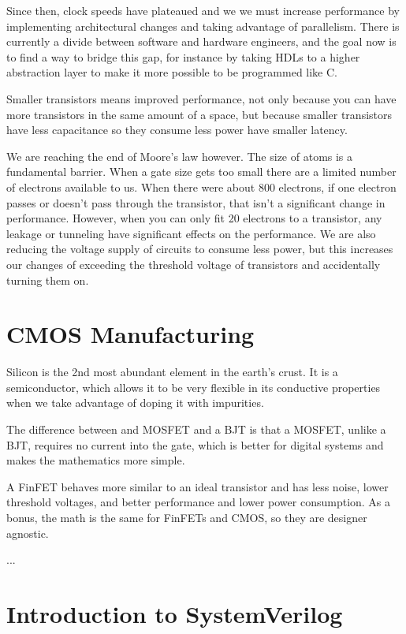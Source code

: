 \documentclass{article}
\begin{document}
Since then, clock speeds have plateaued and we we must increase performance by implementing architectural changes and taking advantage of parallelism. There is currently a divide between software and hardware engineers, and the goal now is to find a way to bridge this gap, for instance by taking HDLs to a higher abstraction layer to make it more possible to be programmed like C.

Smaller transistors means improved performance, not only because you can have more transistors in the same amount of a space, but because smaller transistors have less capacitance so they consume less power have smaller latency.

We are reaching the end of Moore's law however. The size of atoms is a fundamental barrier. When a gate size gets too small there are a limited number of electrons available to us. When there were about 800 electrons, if one electron passes or doesn't pass through the transistor, that isn't a significant change in performance. However, when you can only fit 20 electrons to a transistor, any leakage or tunneling have significant effects on the performance. We are also reducing the voltage supply of circuits to consume less power, but this increases our changes of  exceeding the threshold voltage of transistors and accidentally turning them on.

\section{CMOS Manufacturing}

Silicon is the 2nd most abundant element in the earth's crust. It is a semiconductor, which allows it to be very flexible in its conductive properties when we take advantage of doping it with impurities. 

The difference between and MOSFET and a BJT is that a MOSFET, unlike a BJT, requires no current into the gate, which is better for digital systems and makes the mathematics more simple.

A FinFET behaves more similar to an ideal transistor and has less noise, lower threshold voltages, and better performance and lower power consumption. As a bonus, the math is the same for FinFETs and CMOS, so they are designer agnostic.

...


\section{Introduction to SystemVerilog}
\end{document}
